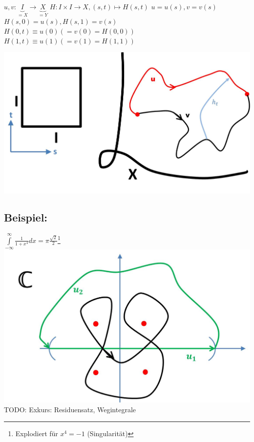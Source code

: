 \documentclass[a4paper,11pt,notitlepage]{report}
\theoremstyle{definition}
\newenvironment{bsp}[1]
{
\setlength{\fboxsep}{10pt}
\subsection*{Beispiel: #1}
\begin{upshape}
}
{
\end{upshape}
}
\begin{document}
$u,v \colon \underbrace{I}_{= X} \rightarrow \underbrace{X}_{=Y}$ \newline
$H \colon I \times I \rightarrow X, (s,t) \mapsto H(s,t)$ \newline
$u = u(s), v= v(s)$ \newline
$H(s,0) = u(s), H(s,1)=v(s)$ \newline
$H(0,t) \equiv u(0) (=v(0) = H(0,0))$ \newline
$H(1,t) \equiv u(1) (=v(1) = H(1,1))$
\begin{center}
\includegraphics[scale=0.3]{images/Homotopie_Menge_von_Wegen.jpg}
\end{center}

\begin{bsp}{}
	$\int\limits_{-\infty}^{\infty}{\frac{1}{1+x^4} dx} = \pi \frac{\sqrt{2}}{2}$\footnote{Explodiert für $x^4 = -1$ (Singularität)}
	\includegraphics[scale=0.4]{images/Residuensatz.jpg}
	\newline
	TODO: Exkurs: Residuensatz, Wegintegrale
\end{bsp}
\end{document}
